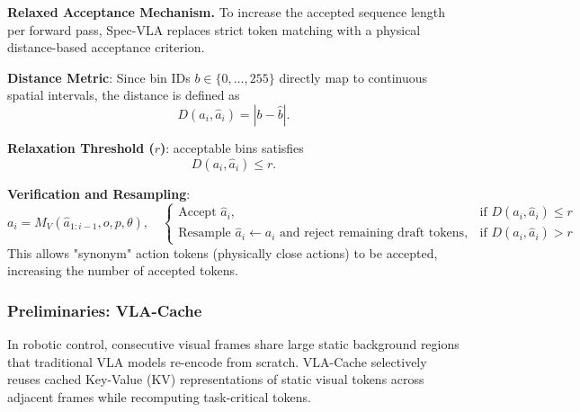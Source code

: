 \textbf{Relaxed Acceptance Mechanism.} To increase the accepted sequence length per forward pass, Spec-VLA replaces strict token matching with a physical distance-based acceptance criterion.

\begin{dashlist}
    \item \textbf{Distance Metric}: Since bin IDs $b \in \{0, \dots, 255\}$ directly map to continuous spatial intervals, the distance is defined as
    \[
    D(a_i, \hat{a}_i) = |b - \hat{b}| .
    \]
    \item \textbf{Relaxation Threshold ($r$)}: acceptable bins satisfies
    \[
    D(a_i, \hat{a}_i) \le r .
    \]
    \item \textbf{Verification and Resampling}:
    \[
    a_i = M_V(\hat{a}_{1:i-1}, o, p, \theta), \quad
    \begin{cases}
    \text{Accept } \hat{a}_i, & \text{if } D(a_i, \hat{a}_i) \le r \\
    \text{Resample } \hat{a}_i \leftarrow a_i \text{ and reject remaining draft tokens}, & \text{if } D(a_i, \hat{a}_i) > r
    \end{cases}
    \]
    This allows "synonym" action tokens (physically close actions) to be accepted, increasing the number of accepted tokens.
\end{dashlist}


\subsubsection{Preliminaries: VLA-Cache}

In robotic control, consecutive visual frames share large static background regions that traditional VLA models re-encode from scratch. VLA-Cache \cite{xu2025vlacacheefficientvisionlanguageactionmanipulation} selectively reuses cached Key-Value (KV) representations of static visual tokens across adjacent frames while recomputing task-critical tokens.

